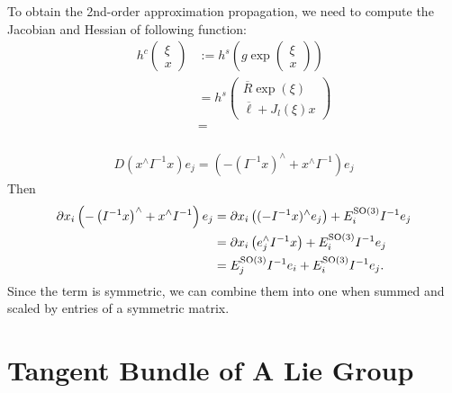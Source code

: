 \documentclass[12pt,class=article,crop=false]{standalone}
\begin{document}
To obtain the 2nd-order approximation propagation, we need to compute the Jacobian and Hessian of following function:
\begin{align*}
	h^c \begin{pmatrix} \xi \\ x \end{pmatrix} &:= h^s \left( g \exp \begin{pmatrix} \xi \\ x \end{pmatrix}  \right) \\
						   & = h^s \begin{pmatrix} \overline{R} \exp(\xi) \\ \overline{ \ell} + J_l(\xi)x \end{pmatrix}  \\
						   &=  \\
\end{align*}




\begin{align*}
	D( x^\wedge I^{-1} x) e_j = \left(-\left( I^{-1} x \right)^\wedge  + x^\wedge I^{-1} \right) e_j
\end{align*}
Then
\begin{align*}
	\partial x_i \left(-\left( I^{-1} x \right)^\wedge  + x^\wedge I^{-1} \right) e_j &= \partial x_i \left( (-I^{-1} x)^\wedge e_j \right) + E_i^{\operatorname{SO}(3)} I^{-1} e_j \\
	&= \partial x_i \left( e_j^\wedge I^{-1}x \right) + E_i^{\operatorname{SO}(3)} I^{-1} e_j\\
	&= E_j^{\operatorname{SO}(3)} I^{-1} e_i +  E_i^{\operatorname{SO}(3)} I^{-1} e_j .
\end{align*}
Since the term is symmetric, we can combine them into one when summed and scaled by entries of a symmetric matrix.

\section{Tangent Bundle of A Lie Group}
\end{document}
